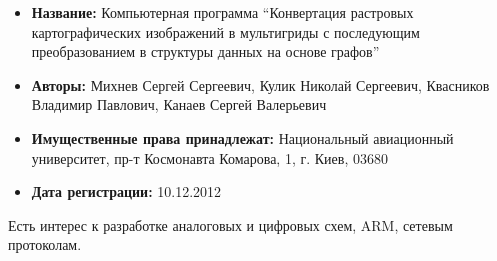 \documentclass[11pt,a4paper,russian]{moderncv}
\begin{document}
\begin{itemize}
\item \textbf{Название:} Компьютерная программа ``Конвертация растровых картографических изображений в мультигриды с последующим преобразованием в структуры данных на основе графов''
\item \textbf{Авторы:} Михнев Сергей Сергеевич, Кулик Николай Сергеевич, Квасников Владимир Павлович, Канаев Сергей Валерьевич
\item \textbf{Имущественные права принадлежат:} Национальный авиационный университет, пр-т Космонавта Комарова, 1, г. Киев, 03680
\item \textbf{Дата регистрации:} 10.12.2012
\end{itemize}
\par{Есть интерес к разработке аналоговых и цифровых схем, ARM, сетевым протоколам.}

\clearpage
\end{document}
